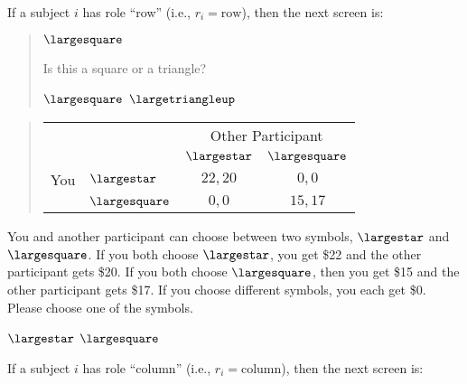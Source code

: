 \documentclass[11pt]{article}
\begin{document}
If a subject $i$ has role ``row'' (i.e., $r_i=\text{row}$), then the next screen is:

\begin{tcolorbox}
\begin{quote}
\begin{center}
{\Huge $\largesquare$}
\end{center}
 \centering Is this a square or a triangle?

 \begin{center}
$\largesquare$ \qquad $\largetriangleup$
\end{center}
\end{quote}

\begin{quote}
\begin{center}
\begin{tabular}{llcc}
    & & \multicolumn{2}{c}{Other Participant}  \\
& & $\largestar$ & $\largesquare$  \\ \cline{3-4}
You & $\largestar$ & \multicolumn{1}{|c|}{$22,20$} & \multicolumn{1}{c|}{$0,0$}  \\ \cline{3-4}
& $\largesquare$ & \multicolumn{1}{|c|}{$0,0$} & \multicolumn{1}{c|}{$15,17$}  \\ \cline{3-4}
\end{tabular}
\end{center}
\end{quote}

You and another participant can choose between two symbols, $\largestar$ and $\largesquare$. If you both choose $\largestar$, you get \$22 and the other participant gets \$20. If you both choose $\largesquare$, then you get \$15 and the other participant gets \$17. If you choose different symbols, you each get \$0.\\

Please choose one of the symbols.\\


\begin{center}
$\largestar$ \qquad $\largesquare$
\end{center}
\end{tcolorbox}

If a subject $i$ has role ``column'' (i.e., $r_i=\text{column}$), then the next screen is:
\end{document}
